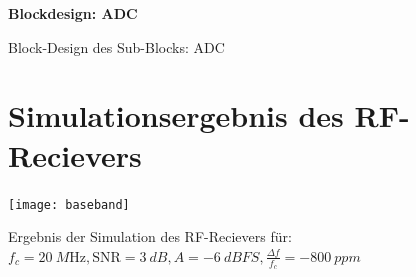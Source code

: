 \begin{landscape}
	\begin{figure}[h]
	  	\centering
		\textbf{Blockdesign: ADC}
  		\caption{Block-Design des Sub-Blocks: ADC}
	\end{figure}

\end{landscape}

\begin{figure}[ht]
	\section{Simulationsergebnis des RF-Recievers} \label{Appendix:Simulation}	
	  	\centering
	  	\texttt{[image: baseband]}
  		\caption{Ergebnis der Simulation des RF-Recievers für: $f_c=\qty{20}{M\hertz}, \mathrm{SNR}=\qty{3}{dB}, A=\qty{-6}{dBFS}, \frac{\Delta f}{f_c} = \qty{-800}{ppm}$} 
  		\label{Abb:Result}
\end{figure}